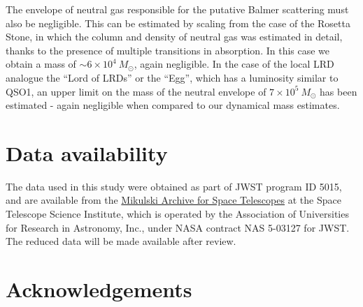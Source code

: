 \documentclass[twocolumn, fleqn]{doc_class}
\begin{document}
The envelope of neutral gas responsible for the putative Balmer scattering must also be negligible. This can be estimated by scaling from the case of the Rosetta Stone, in which the column and density of neutral gas was estimated in detail, thanks to the presence of multiple transitions in absorption. In this case we obtain a mass of $\sim 6\times 10^4~M_\odot$, again negligible. 
In the case of the local LRD analogue
the ``Lord of LRDs'' or the
``Egg'', which has a luminosity similar to QSO1, an upper limit on the mass of the neutral envelope of $7\times 10^5~M_\odot$ has been estimated - again negligible when compared to our dynamical mass estimates.

\clearpage

\section*{Data availability}
The data used in this study were obtained as part of JWST program ID 5015, and are
available from the \href{https://mast.stsci.edu/portal/Mashup/Clients/Mast/Portal.html}{Mikulski Archive for Space Telescopes} at the Space Telescope Science Institute, which is operated by the Association of Universities for Research in Astronomy, Inc., under NASA contract NAS 5-03127 for JWST.
The reduced data will be made available after review.









\section*{Acknowledgements}
\end{document}
